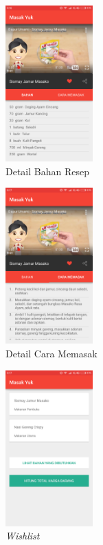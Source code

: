 		\begin{figure}[H]
			\centering
			\includegraphics[width=0.3\textwidth]{gambar/mock-up/Detail}
			\caption{Detail Bahan Resep}
			\label{detail_bahan}
		\end{figure}
		\begin{figure}[H]
			\centering
			\includegraphics[width=0.3\textwidth]{gambar/mock-up/detail_cara}
			\caption{Detail Cara Memasak}
			\label{detail_cara}
		\end{figure}
		\begin{figure}[H]
			\centering
			\includegraphics[width=0.3\textwidth]{gambar/mock-up/wishlist}
			\caption{\textit{Wishlist}}
		\end{figure}
